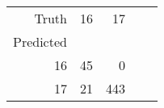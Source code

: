 \begin{tabular}{rrrrr}
\toprule
Truth & 16 & 17 \\
Predicted &  &  \\
\midrule
16 & 45 & 0 \\
17 & 21 & 443 \\
\bottomrule
\end{tabular}

